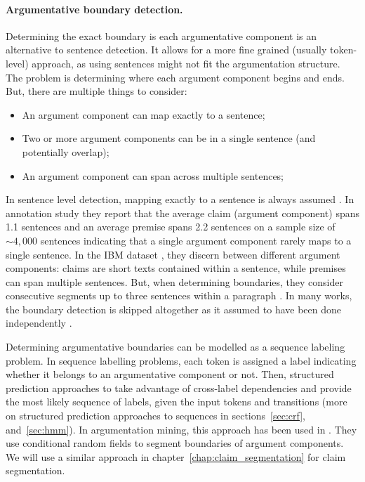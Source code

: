 \paragraph{Argumentative boundary detection.}
Determining the exact boundary is each argumentative component is an
alternative to sentence detection. It allows for a more fine grained (usually
token-level) approach, as using sentences might not fit the argumentation
structure. 
The problem is determining where each argument component begins and ends.
But, there are multiple things to consider:
\begin{itemize}
\item An argument component can map exactly to a sentence;
\item Two or more argument components can be in a single sentence (and potentially overlap);
\item An argument component can span across multiple sentences;
\end{itemize}
In sentence level detection, mapping exactly to a sentence is always assumed
\citep{palau2009argumentation, levy2014context}. 
In \citet{habernal2014argumentation} annotation study they report
that the average claim (argument component) spans 1.1 sentences and an average
premise spans 2.2 sentences on a sample size of ${\sim}4,000$ sentences 
indicating that a single argument component 
rarely maps to a single sentence. In the IBM dataset \citep{levy2014context},
they discern between different argument components: claims are short texts
contained within a sentence, while premises can span multiple sentences. But, when
determining boundaries, they consider consecutive segments up to three
sentences within a paragraph \citep{rinott2015show}.
In many works, the boundary detection is skipped altogether as it assumed to have
been done independently \citep{stab2014identifying, eckle2015role}. 

Determining argumentative boundaries can be modelled as a sequence labeling
problem. In sequence labelling problems, each token 
is assigned a label indicating whether it belongs to an
argumentative component or not.  
Then, structured prediction approaches to take advantage of cross-label dependencies
and provide the most likely sequence of labels, given the input tokens 
and transitions (more on structured prediction approaches to sequences in sections~\ref{sec:crf},
and~\ref{sec:hmm}).
In argumentation mining, this approach 
has been used in 
\citep{goudas2014argument, sardianos2015argument, park2015conditional}.
They use conditional random fields to segment boundaries 
of argument components. 
We will use a similar approach in
chapter~\ref{chap:claim_segmentation} for claim segmentation. 

